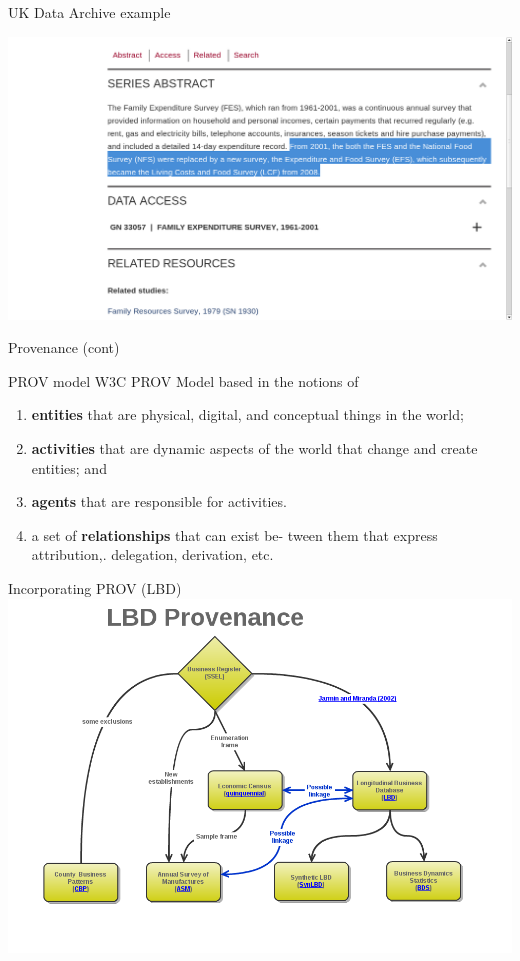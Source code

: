 \begin{frame}{UK Data Archive example}
\begin{center}
\includegraphics[width=1\linewidth]{uk_data_archive_zoom}
\end{center}
\end{frame}


\begin{frame}{Provenance (cont)}
\begin{block}{PROV model}
W3C PROV Model  based in the notions of 
\begin{enumerate}
\item \textbf{entities} that are physical, digital, and conceptual
things in the world; 
\item \textbf{activities} that are dynamic aspects of the world that change and
create entities; and 
\item \textbf{agents} that are responsible for activities. 
\item  a set of \textbf{relationships} that can exist be-
tween them that express attribution,. delegation, derivation, etc.
\end{enumerate}
\end{block}
\end{frame}

\begin{frame}{Incorporating PROV (LBD)}
\includegraphics[width=\textwidth]{LBD_Provenance.png}
\end{frame}

